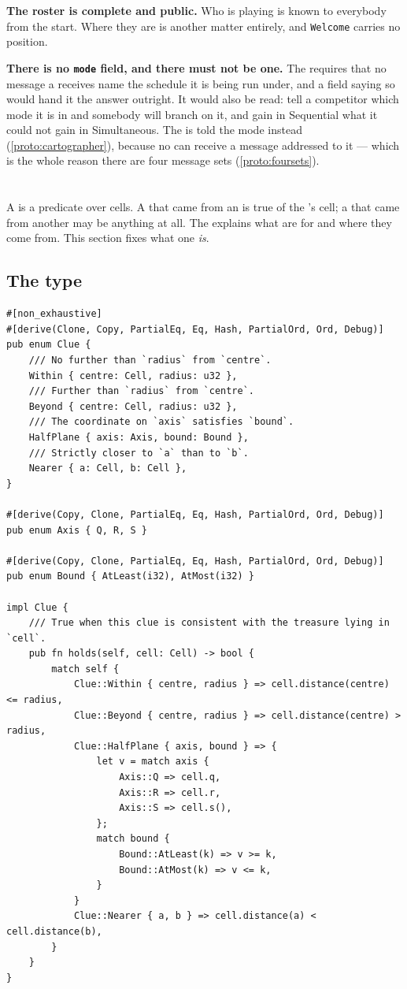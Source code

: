 \documentclass{article}
\begin{document}
\textbf{The roster is complete and public.} Who is playing is known to everybody from the start.
Where they are is another matter entirely, and \texttt{Welcome} carries no position.

\textbf{There is no \texttt{mode} field, and there must not be one.} The \MD{} requires that no
message a \ship{} receives name the schedule it is being run under, and a field saying so would
hand it the answer outright. It would also be read: tell a competitor which mode it is in
and somebody will branch on it, and gain in Sequential what it could not gain in Simultaneous.
The \cartographer{} is told the mode instead (\cref{proto:cartographer}), because no \ship{} can
receive a message addressed to it --- which is the whole reason there are four message sets
(\cref{proto:foursets}).

\newpage
\section{\clues{}}
\label{proto:clue}

A \clue{} is a predicate over cells. A \clue{} that came from an \island{} is true of the
\treasure{}'s cell; a \clue{} that came from another \ship{} may be anything at all. The \MD{}
explains what \clues{} are for and where they come from. This section fixes what one \emph{is}.

\subsection{The type}

\begin{lstlisting}
#[non_exhaustive]
#[derive(Clone, Copy, PartialEq, Eq, Hash, PartialOrd, Ord, Debug)]
pub enum Clue {
    /// No further than `radius` from `centre`.
    Within { centre: Cell, radius: u32 },
    /// Further than `radius` from `centre`.
    Beyond { centre: Cell, radius: u32 },
    /// The coordinate on `axis` satisfies `bound`.
    HalfPlane { axis: Axis, bound: Bound },
    /// Strictly closer to `a` than to `b`.
    Nearer { a: Cell, b: Cell },
}

#[derive(Copy, Clone, PartialEq, Eq, Hash, PartialOrd, Ord, Debug)]
pub enum Axis { Q, R, S }

#[derive(Copy, Clone, PartialEq, Eq, Hash, PartialOrd, Ord, Debug)]
pub enum Bound { AtLeast(i32), AtMost(i32) }

impl Clue {
    /// True when this clue is consistent with the treasure lying in `cell`.
    pub fn holds(self, cell: Cell) -> bool {
        match self {
            Clue::Within { centre, radius } => cell.distance(centre) <= radius,
            Clue::Beyond { centre, radius } => cell.distance(centre) > radius,
            Clue::HalfPlane { axis, bound } => {
                let v = match axis {
                    Axis::Q => cell.q,
                    Axis::R => cell.r,
                    Axis::S => cell.s(),
                };
                match bound {
                    Bound::AtLeast(k) => v >= k,
                    Bound::AtMost(k) => v <= k,
                }
            }
            Clue::Nearer { a, b } => cell.distance(a) < cell.distance(b),
        }
    }
}
\end{lstlisting}
\end{document}
